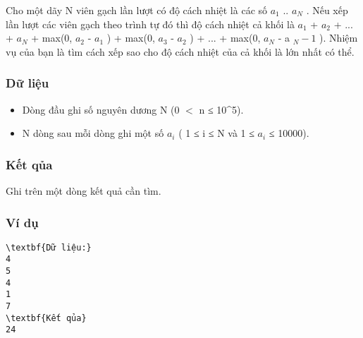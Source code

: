 



   Cho một dãy N viên gạch lần lượt có độ cách nhiệt là các số $a_{1}$   .. $a_{N}$   . Nếu xếp lần lượt các viên gạch theo trình tự đó thì độ cách nhiệt cả khối là $a_{1}$   + $a_{2}$   + ... + $a_{N}$   + max(0, $a_{2}$   - $a_{1}$   ) + max(0, $a_{3}$   - $a_{2}$   ) + ... + max(0, $a_{N}$   - a   $_    N - 1   $   ). Nhiệm vụ của bạn là tìm cách xếp sao cho độ cách nhiệt của cả khối là lớn nhất có thể.  

\subsubsection{   Dữ liệu  }
\begin{itemize}
	\item     Dòng đầu ghi số nguyên dương N (0 $<$ n ≤ 10^5).   
	\item     N dòng sau mỗi dòng ghi một số $a_{i}$    ( 1 ≤ i ≤ N và 1 ≤ $a_{i}$    ≤ 10000).   
\end{itemize}

\subsubsection{   Kết qủa  }

   Ghi trên một dòng kết quả cần tìm.  

\subsubsection{   Ví dụ  }
\begin{verbatim}
\textbf{Dữ liệu:} 
4
5
4
1
7
\textbf{Kết qủa} 
24 
\end{verbatim}
